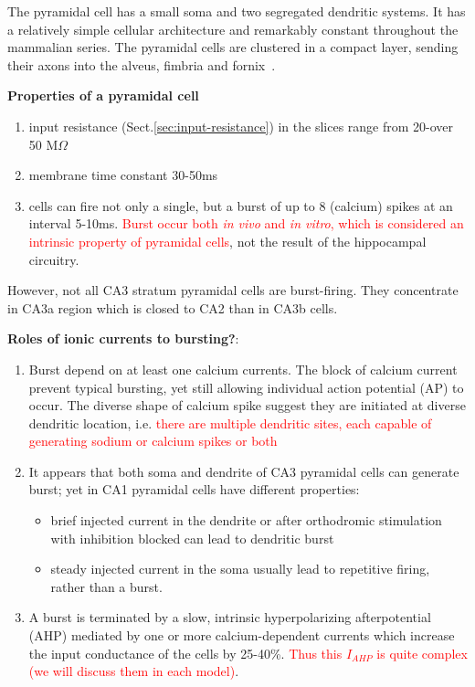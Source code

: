 The pyramidal cell has a small soma and two segregated dendritic
systems. It has a relatively simple cellular architecture and
remarkably constant throughout the mammalian series. The pyramidal
cells are clustered in a compact layer, sending their axons into the
alveus, fimbria and fornix~\citep{kandel1961ehn_a}. 

{\bf Properties of a pyramidal cell}
\begin{enumerate}

\item input resistance (Sect.\ref{sec:input-resistance}) in the slices range
from 20-over 50 M$\Omega$

\item membrane time constant 30-50ms
\item cells can fire not only a single, but a burst of up to 8
  (calcium) spikes at an interval 5-10ms.
  \textcolor{red}{Burst occur both {\it in vivo} and {\it in vitro},
    which is considered an intrinsic property of pyramidal cells}, not
    the result of the hippocampal circuitry.

\end{enumerate}
However, not all CA3 stratum pyramidal cells are burst-firing. They
concentrate in CA3a region which is closed to CA2 than in CA3b
cells.


{\bf Roles of ionic currents to bursting?}:
\begin{enumerate}
\item Burst depend on at least one calcium currents. The block of
  calcium current prevent typical bursting, yet still allowing
  individual action potential (AP) to occur. The diverse shape of
  calcium spike suggest they are initiated at diverse dendritic
  location, i.e.
  \textcolor{red}{there are multiple dendritic sites, each capable of
    generating sodium or calcium spikes or both}

\item It appears that both soma and dendrite of CA3 pyramidal cells
  can generate burst; yet in CA1 pyramidal cells have different
  properties:
  \begin{itemize}
  \item brief injected current in the dendrite or after orthodromic
    stimulation with inhibition blocked can lead to dendritic burst
  \item steady injected current in the soma usually lead to repetitive
    firing, rather than a burst.
  \end{itemize}

\item A burst is terminated by a slow, intrinsic hyperpolarizing
  afterpotential (AHP) mediated by one or more calcium-dependent
   currents which increase the input conductance of the cells
  by 25-40\%.
  \textcolor{red}{Thus this $I_{AHP}$ is quite complex (we will
    discuss them in each model)}.
\end{enumerate}


